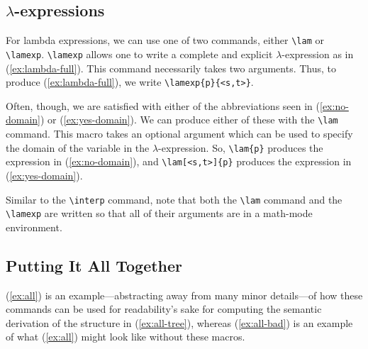 \documentclass{article}
\newcommand{\interp}[2][]{
	\(
		\left\llbracket\,\text{#2}\,\right\rrbracket^{#1}
	\)
	}
\newcommand{\lam}[2][]{$\lambda {#2}_{#1}$.}
\newcommand{\lamexp}[2]{$\lambda {#1} \in D_{#2}$.}
\begin{document}
\subsection{$\lambda$-expressions}

For lambda expressions, we can use one of two commands, either \verb|\lam| or \verb|\lamexp|. \verb|\lamexp| allows one to write a complete and explicit $\lambda$-expression as in (\ref{ex:lambda-full}). This command necessarily takes two arguments. Thus, to produce (\ref{ex:lambda-full}), we write \verb|\lamexp{p}{<s,t>}|.

\begin{exe}
	\ex{
		\begin{xlist}
			\ex{\label{ex:lambda-full}\lamexp{p}{<s,t>}}
			\ex{\label{ex:no-domain}\lam{p}}
			\ex{\label{ex:yes-domain}\lam[<s,t>]{p}}
		\end{xlist}
	}
\end{exe}

Often, though, we are satisfied with either of the abbreviations seen in (\ref{ex:no-domain}) or (\ref{ex:yes-domain}). We can produce either of these with the \verb|\lam| command. This macro takes an optional argument which can be used to specify the domain of the variable in the $\lambda$-expression. So, \verb|\lam{p}| produces the expression in (\ref{ex:no-domain}), and \verb|\lam[<s,t>]{p}| produces the expression in (\ref{ex:yes-domain}). 

Similar to the \verb|\interp| command, note that both the \verb|\lam| command and the \verb|\lamexp| are written so that all of their arguments are in a math-mode environment.

\subsection{Putting It All Together}

(\ref{ex:all}) is an example---abstracting away from many minor details---of how these commands can be used for readability's sake for computing the semantic derivation of the structure in (\ref{ex:all-tree}), whereas (\ref{ex:all-bad}) is an example of what (\ref{ex:all}) might look like without these macros.
\end{document}
